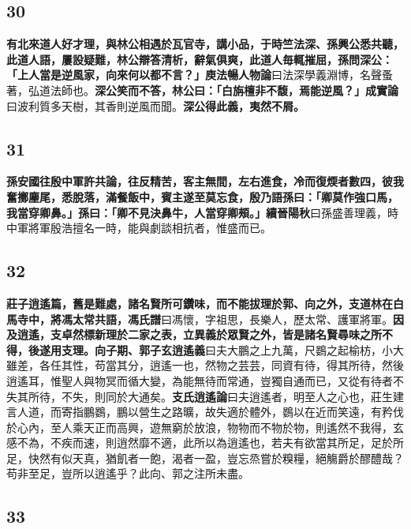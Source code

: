 \subsection*{30}

\textbf{有北來道人好才理，與林公相遇於瓦官寺，講小品，于時竺法深、孫興公悉共聽，此道人語，屢設疑難，林公辯答清析，辭氣俱爽，此道人毎輒摧屈，孫問深公：「上人當是逆風家，向來何以都不言？」}{\footnotesize \textbf{庾法暢人物論}曰法深學義淵博，名聲蚤著，弘道法師也。}\textbf{深公笑而不答，林公曰：「白旃檀非不馥，焉能逆風？」}{\footnotesize \textbf{成實論}曰波利質多天樹，其香則逆風而聞。}\textbf{深公得此義，夷然不屑。}

\subsection*{31}

\textbf{孫安國往殷中軍許共論，往反精苦，客主無間，左右進食，冷而復煗者數四，彼我奮擲麈尾，悉脫落，滿餐飯中，賓主遂至莫忘食，殷乃語孫曰：「卿莫作強口馬，我當穿卿鼻。」孫曰：「卿不見決鼻牛，人當穿卿頰。」}{\footnotesize \textbf{續晉陽秋}曰孫盛善理義，時中軍將軍殷浩擅名一時，能與劇談相抗者，惟盛而已。}

\subsection*{32}

\textbf{莊子逍遙篇，舊是難處，諸名賢所可鑽味，而不能拔理於郭、向之外，支道林在白馬寺中，將馮太常共語，}{\footnotesize \textbf{馮氏譜}曰馮懷，字祖思，長樂人，歷太常、護軍將軍。}\textbf{因及逍遙，支卓然標新理於二家之表，立異義於眾賢之外，皆是諸名賢尋味之所不得，後遂用支理。}{\footnotesize \textbf{向子期、郭子玄逍遙義}曰夫大鵬之上九萬，尺鷃之起榆枋，小大雖差，各任其性，苟當其分，逍遙一也，然物之芸芸，同資有待，得其所待，然後逍遙耳，惟聖人與物冥而循大變，為能無待而常通，豈獨自通而已，又從有待者不失其所待，不失，則同於大通矣。\textbf{支氏逍遙論}曰夫逍遙者，明至人之心也，莊生建言人道，而寄指鵬鷃，鵬以營生之路曠，故失適於體外，鷃以在近而笑遠，有矜伐於心內，至人乘天正而高興，遊無窮於放浪，物物而不物於物，則遙然不我得，玄感不為，不疾而速，則逍然靡不適，此所以為逍遙也，若夫有欲當其所足，足於所足，快然有似天真，猶飢者一飽，渴者一盈，豈忘烝嘗於糗糧，絕觴爵於醪醴哉？苟非至足，豈所以逍遙乎？此向、郭之注所未盡。}

\subsection*{33}

